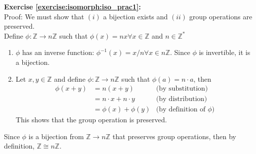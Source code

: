 \noindent\textbf{Exercise \ref{exercise:isomorph:iso_prac1}:}
\\
Proof:  We must show that $(i)$ a bijection exists and $(ii)$ group operations are preserved.
\\
Define $\phi: {\mathbb Z} \rightarrow n{\mathbb Z}$ such that $\phi(x) = nx \forall x \in {\mathbb Z}$ and $n \in {\mathbb Z}^*$
\begin{enumerate}[($i$)]
\item
$\phi$ has an inverse function:  $\phi^{-1}(x) = x/n \forall x \in n{\mathbb Z}$.  Since $\phi$ is invertible, it is a bijection.

\item
Let $x, y \in {\mathbb Z}$ and define $\phi: {\mathbb Z} \rightarrow n{\mathbb Z}$ such that $\phi(a) = n\cdot a$, then
\\
\begin{align*}
\phi(x + y) &= n(x + y) &\text{(by substitution)}
\\
&= n\cdot x + n\cdot y &\text{(by distribution)}
\\
&= \phi(x) + \phi(y) &\text{(by definition of\ } \phi)
\end{align*}
This shows that the group operation is preserved.  
\end{enumerate}
Since $\phi$  is a bijection from ${\mathbb Z} \rightarrow n{\mathbb Z}$ that preserves group operations, then by definition, ${\mathbb Z} \cong n{\mathbb Z}$.
\\
\\

